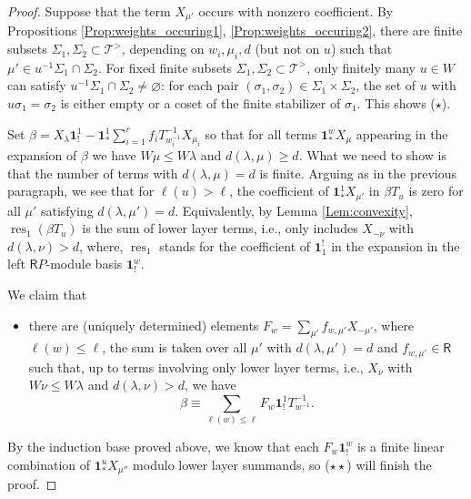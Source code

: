\documentclass{amsart}
\newcommand{\Ring}{\mathsf{R}}
\newcommand{\bone}{\mathbf{1}}
\theoremstyle{definition}
\numberwithin{equation}{section}
\begin{document}
\begin{proof}
Suppose that the term $X_{\mu'}$ occurs with nonzero coefficient. By Propositions \ref{Prop:weights_occuring1}, \ref{Prop:weights_occuring2}, there are finite subsets $\Sigma_1,\Sigma_2\subset \mathcal{T}^>$, depending on $w_i,\mu_i,d$ (but not on $u$) such that
$\mu'\in u^{-1}\Sigma_1\cap \Sigma_2$. For fixed finite subsets $\Sigma_1,\Sigma_2\subset \mathcal{T}^>$, only finitely many $u\in W$ can satisfy $u^{-1}\Sigma_1\cap \Sigma_2\neq\varnothing$: for each pair $(\sigma_1,\sigma_2)\in \Sigma_1\times \Sigma_2$, the set of $u$ with $u\sigma_1=\sigma_2$ is either empty or a coset of the finite stabilizer of $\sigma_1$. This shows ($\star$).

Set $\beta=X_{\lambda}\bone_!^1-\bone_*^1\sum_{i=1}^r f_i T_{w_i^{-1}}^{-1}X_{\mu_i}$ so that for all terms $\bone_*^w X_\mu$ appearing in the expansion of $\beta$ we have $W\mu\leqslant W\lambda$ and $d(\lambda,\mu)\geqslant d$. What we need to show is that the number of terms with $d(\lambda,\mu)=d$ is finite. Arguing as in the previous paragraph, we see that for $\ell(u)>\ell$, the coefficient of $\bone_*^1X_{\mu'}$ in $\beta T_u$ is zero for all $\mu'$ satisfying $d(\lambda,\mu')=d$. Equivalently, by Lemma \ref{Lem:convexity}, $\operatorname{res}_1(\beta T_u)$ is the sum of lower layer terms, i.e., only includes $X_{-\nu}$ with $d(\lambda,\nu)>d$, where, $\operatorname{res}_1$ stands for the coefficient of $\bone^!_1$ in the expansion in the left $\Ring P$-module basis $\bone^w_!$.


We claim that
\begin{itemize}
\item[($\star\star$)]
there are (uniquely determined) elements $F_w=\sum_{\mu'}f_{w,\mu'}X_{-\mu'}$, where $\ell(w)\leqslant \ell$, the sum is taken over all $\mu'$ with $d(\lambda,\mu')=d$ and $f_{w,\mu'}\in \Ring$
such that, up to terms involving only lower layer terms, i.e., $X_\nu$ with $W\nu\leqslant W\lambda$ and $d(\lambda,\nu)>d$, we have
$$\beta\equiv\sum_{\ell(w)\leqslant \ell}F_w\bone_!^1T_{w^{-1}}^{-1}.$$
\end{itemize}
By the induction base proved above, we know that each $F_w\bone_!^w$ is a finite linear combination of $\bone^u_*X_{\mu''}$ modulo lower layer summands, so ($\star\star$) will finish the proof.


\end{proof}
\end{document}
